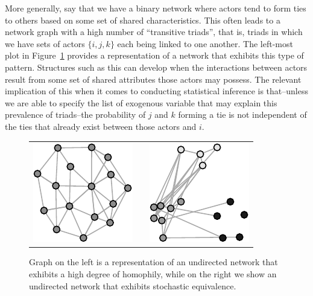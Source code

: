 \documentclass[12pt,pdflatex]{elsarticle}
\begin{document}
More generally, say that we have a binary network where actors tend to form ties to others based on some set of shared characteristics. This often leads to a network graph with a high number of ``transitive triads'', that is, triads in which we have sets of actors $\{i,j,k\}$ each being linked to one another. The left-most plot in Figure~\ref{fig:homphStochEquivNet} provides a representation of a network that exhibits this type of pattern. Structures such as this can develop when the interactions between actors result from some set of shared attributes those actors may possess. The relevant implication of this when it comes to conducting statistical inference is that--unless we are able to specify the list of exogenous variable that may explain this prevalence of triads--the probability of $j$ and $k$ forming a tie is not independent of the ties that already exist between those actors and $i$. 

\begin{figure}[ht]
	\centering
	\begin{tabular}{lcr}
	\includegraphics[width=.33\textwidth]{homophNet} & \hspace{2cm} &
	\includegraphics[width=.33\textwidth]{stochEquivNet}	
	\end{tabular}
	\caption{Graph on the left is a representation of an undirected network that exhibits a high degree of homophily, while on the right we show an undirected network that exhibits stochastic equivalence. }
	\label{fig:homphStochEquivNet}
\end{figure}
\end{document}
